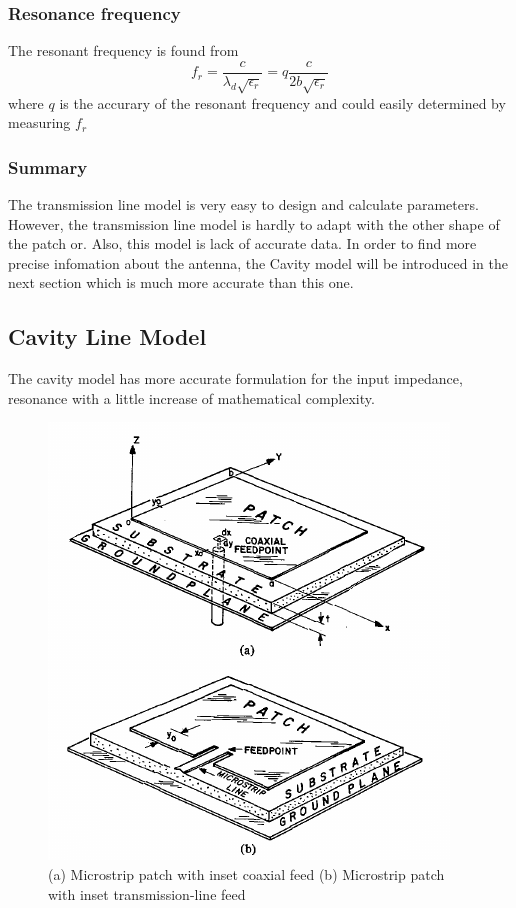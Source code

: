 \documentclass[11pt,a4paper]{article}
\begin{document}
      \subsubsection{Resonance frequency}
        \indent The resonant frequency is found from
        \begin{equation}
          f_r = \frac{c}{\lambda_d\sqrt{\epsilon_r}} = q\frac{c}{2b\sqrt{\epsilon_r}}
        \end{equation}
        \indent where $q$ is the accurary of the resonant frequency and could easily determined by measuring $f_r$ \cite{CaM:81}
      
        \subsubsection{Summary}
        \indent The transmission line model is very easy to design and calculate parameters. However, the transmission line
                model is hardly to adapt with the other shape of the patch or. Also, this model is lack of accurate data.
                In order to find more precise infomation about the antenna, the Cavity model will be introduced 
                in the next section which is much more accurate than this one.\cite{CaM:81,NoK:05}
  \newpage

    \subsection{Cavity Line Model}
    \indent The cavity model has more accurate formulation for the input impedance, resonance with a little
            increase of mathematical complexity.\cite{CaM:81}
    \begin{figure}[ht]
      \label{cavitymodel}
      \includegraphics{cavitymodel.png}
      \centering
      \caption{(a) Microstrip patch with inset coaxial feed
               (b) Microstrip patch with inset transmission-line feed
              }
    \end{figure}
\end{document}

